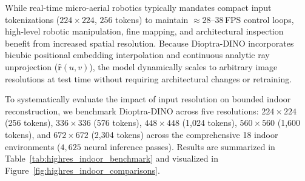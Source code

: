 While real-time micro-aerial robotics typically mandates compact input tokenizations ($224 \times 224$, $256$ tokens) to maintain $\approx 28\text{--}38$\,FPS control loops, high-level robotic manipulation, fine mapping, and architectural inspection benefit from increased spatial resolution. Because Dioptra-DINO incorporates bicubic positional embedding interpolation and continuous analytic ray unprojection ($\hat{\mathbf{r}}(u, v)$), the model dynamically scales to arbitrary image resolutions at test time without requiring architectural changes or retraining.

To systematically evaluate the impact of input resolution on bounded indoor reconstruction, we benchmark Dioptra-DINO across five resolutions: $224 \times 224$ (256 tokens), $336 \times 336$ (576 tokens), $448 \times 448$ (1,024 tokens), $560 \times 560$ (1,600 tokens), and $672 \times 672$ (2,304 tokens) across the comprehensive 18 indoor environments ($4{,}625$ neural inference passes). Results are summarized in Table~\ref{tab:highres_indoor_benchmark} and visualized in Figure~\ref{fig:highres_indoor_comparisons}.

\begin{table}[h]
\centering
\caption{\textbf{Multi-Resolution Indoor Metric Depth Benchmark Across Input Sizes}. Evaluated on Apple Silicon MPS hardware across all indoor environments. Dioptra-DINO scales from edge-speed ($224^2$, $27.9$\,FPS) to high-precision ($672^2$, $2{,}304$ tokens). Metric3D ($616 \times 1064$) and Depth Anything V2 ($518 \times 518$) shown for comparative reference.}
\label{tab:highres_indoor_benchmark}
\vspace{0.2em}
\end{table}

